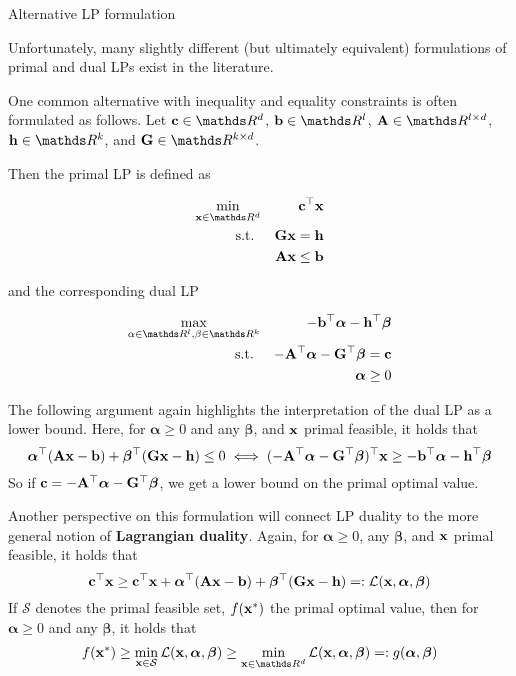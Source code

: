 \documentclass[11pt,compress,t,notes=noshow, xcolor=table]{beamer}
\begin{document}
\begin{vbframe}{Alternative LP formulation}

Unfortunately, many slightly different (but ultimately equivalent) formulations of primal and dual LPs exist in the literature. 

One common alternative with inequality and equality constraints is often formulated as
follows. Let $\mathbf{c} \in \R^d$, $\mathbf{b} \in \R^l$, $\Amat \in \R^{l \times d}$, $\mathbf{h} \in \R^k$, and $\mathbf{G} \in \R^{k \times d}$.

Then the primal LP is defined as 

\begin{eqnarray*}
    \min_{\xv \in \R^d} && \mathbf{c}^\top\xv \\
    \text{s.t. } && \mathbf{G} \xv = \mathbf{h} \\
                 && \Amat \xv \le \mathbf{b} 
\end{eqnarray*}

\framebreak

and the corresponding dual LP 

\begin{eqnarray*}
 \max_{\alpha \in \R^l, \beta \in \R^k} && -\mathbf{b}^\top\bm{\alpha} -\mathbf{h}^\top\bm{\beta} \\
\text{s.t. } && -\Amat^\top \bm{\alpha} - \mathbf{G}^\top \bm{\beta} = \mathbf{c}\\
             && \bm{\alpha} \ge 0 
\end{eqnarray*}

The following argument again highlights the interpretation of the dual
LP as a lower bound.
Here, for $\bm{\alpha} \geq 0$ and any $\bm{\beta}$, and $\mathbf{x}$ primal feasible, it holds that 
$$
    \bm{\alpha}^\top (\mathbf{A} \mathbf{x} - \mathbf{b}) + \bm{\beta}^\top (\mathbf{G} \mathbf{x} - \mathbf{h}) \le 0
    \iff (-\mathbf{A}^\top \bm{\alpha} - \mathbf{G}^\top \bm{\beta})^\top \mathbf{x} \geq -\mathbf{b}^\top \bm{\alpha} - \mathbf{h}^\top \bm{\beta}
$$
So if $\mathbf{c} = -\mathbf{A}^\top \bm{\alpha} - \mathbf{G}^\top \bm{\beta}$, we get a lower bound on the
primal optimal value.

\framebreak

Another perspective on this formulation will connect LP duality to the more general notion of \textbf{Lagrangian duality}.
Again, for $\bm{\alpha} \geq 0$, any $\bm{\beta}$, and $\mathbf{x}$ primal feasible, it holds that
$$
\mathbf{c}^\top \mathbf{x} \ge \mathbf{c}^\top \mathbf{x} + \bm{\alpha}^\top (\mathbf{A} \mathbf{x} - \mathbf{b}) + \bm{\beta}^\top (\mathbf{G} \mathbf{x} - \mathbf{h}) =: \mathcal{L}(\mathbf{x},\bm{\alpha},\bm{\beta})
$$
If $\mathcal{S}$ denotes the primal feasible set, $f(\mathbf{x}^*)$ the primal optimal value, then for $\bm{\alpha} \geq 0$ and any $\bm{\beta}$, it holds that
$$
    f(\xv^*) \ge \min_{\xv \in \mathcal{S}}\mathcal{L}(\xv,\bm{\alpha},\bm{\beta}) \ge \min_{\xv \in \R^d} \mathcal{L}(\xv,\bm{\alpha},\bm{\beta}) =: g(\bm{\alpha},\bm{\beta})
$$


\end{vbframe}
\end{document}
